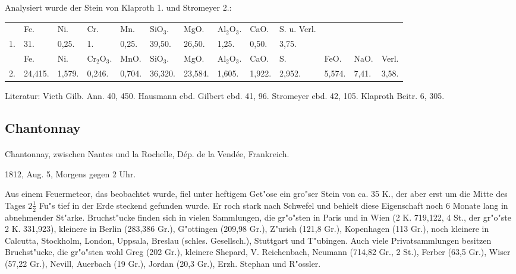 \documentclass[a4paper, 11pt, oneside]{article}
\begin{document}
Analysiert wurde der Stein von Klaproth 1. und Stromeyer 2.:
\begin{table}[!ht]
    \centering
    \footnotesize
    \begin{tabular}{p{3mm} p{6mm} p{5mm} p{6mm} p{5mm} p{6mm} p{7mm} p{5mm} p{5mm} p{13mm} p{4mm} p{4mm} p{4mm}}
         & Fe. & Ni. & Cr. & Mn. & SiO$_{3}$. & MgO. & Al$_{2}$O$_{3}$. & CaO. & S. u. Verl. &  &  &  \\ 
        1. & 31. & 0,25. & 1. & 0,25. & 39,50. & 26,50. & 1,25. & 0,50. & 3,75. &  &  &  \\ \hline
         & Fe. & Ni. & Cr$_{2}$O$_{3}$. & MnO. & SiO$_{3}$. & MgO. & Al$_{2}$O$_{3}$. & CaO. & S. & FeO. & NaO. & Verl. \\
        2. & 24,415. & 1,579. & 0,246. & 0,704. & 36,320. & 23,584. & 1,605. & 1,922. & 2,952. & 5,574. & 7,41. & 3,58. \\
    \end{tabular}
\end{table}

\footnotesize
Literatur: Vieth Gilb. Ann. 40, 450. Hausmann ebd. Gilbert ebd. 41, 96. Stromeyer ebd. 42, 105. Klaproth Beitr. 6, 305.
\subsection{Chantonnay}
\normalsize
\paragraph{}
Chantonnay, zwischen Nantes und la Rochelle, Dép. de la Vendée, Frankreich.

1812, Aug. 5, Morgens gegen 2 Uhr.

Aus einem Feuermeteor, das beobachtet wurde, fiel unter heftigem Get"ose ein gro"ser Stein von ca. 35 K., der aber erst um die Mitte des Tages $2\frac{1}{2}$ Fu"s tief in der Erde steckend gefunden wurde. Er roch stark nach Schwefel und behielt diese Eigenschaft noch 6 Monate lang in abnehmender St"arke. Bruchst"ucke finden sich in vielen Sammlungen, die gr"o"sten in Paris und in Wien (2 K. 719,122, 4 St., der gr"o"ste 2 K. 331,923), kleinere in Berlin (283,386 Gr.), G"ottingen (209,98 Gr.), Z"urich (121,8 Gr.), Kopenhagen (113 Gr.), noch kleinere in Calcutta, Stockholm, London, Uppsala, Breslau (schles. Gesellsch.), Stuttgart und T"ubingen. Auch viele Privatsammlungen besitzen Bruchst"ucke, die gr"o"sten wohl Greg (202 Gr.), kleinere Shepard, V. Reichenbach, Neumann (714,82 Gr., 2 St.), Ferber (63,5 Gr.),
Wiser (57,22 Gr.), Nevill, Auerbach (19 Gr.), Jordan (20,3 Gr.), Erzh. Stephan und R"ossler.
\end{document}

